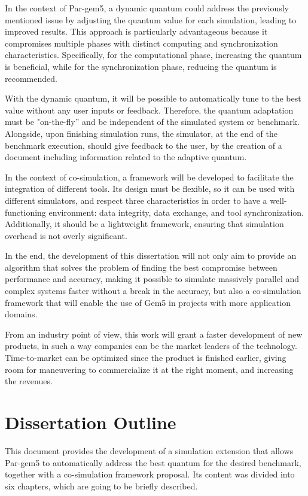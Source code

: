 In the context of Par-gem5, a dynamic quantum could address the previously mentioned issue by adjusting the quantum value for each simulation, 
leading to improved results. 
This approach is particularly advantageous because it compromises multiple phases with distinct computing and synchronization 
characteristics. Specifically, for the computational phase, increasing the quantum is beneficial, while for the synchronization phase, 
reducing the quantum is recommended.

With the dynamic quantum, it will be possible to automatically tune to the best value without any user inputs or feedback. 
Therefore, the quantum adaptation must be "on-the-fly” and be independent of the simulated system or benchmark. 
Alongside, upon finishing simulation runs, the simulator, at the end of the benchmark execution, should give feedback to the user, 
by the creation of a document including information related to the adaptive quantum.

In the context of co-simulation, a framework will be developed to facilitate the integration of different tools. Its design 
must be flexible, so it can be used with different simulators, and respect three characteristics in order to have a well-functioning
environment: data integrity, data exchange, and tool synchronization. Additionally, it should be a lightweight framework, 
ensuring that simulation overhead is not overly significant.

In the end, the development of this dissertation will not only aim to provide an algorithm that solves the problem of 
finding the best compromise between performance and accuracy, making it possible to simulate 
massively parallel and complex systems faster without a break in the accuracy, but also a co-simulation framework that will enable the use 
of Gem5 in projects with more application domains.

From an industry point of view, this work will grant a faster development of new products, in such a way companies can be the market leaders 
of the technology. Time-to-market can be optimized since the product is finished earlier, giving room for maneuvering to commercialize it at the 
right moment, and increasing the revenues.
 
\section{Dissertation Outline}

This document provides the development of a simulation extension that allows Par-gem5 to automatically address the best quantum for the desired 
benchmark, together with a co-simulation framework proposal. Its content was divided into six chapters, which are going to be briefly described.

